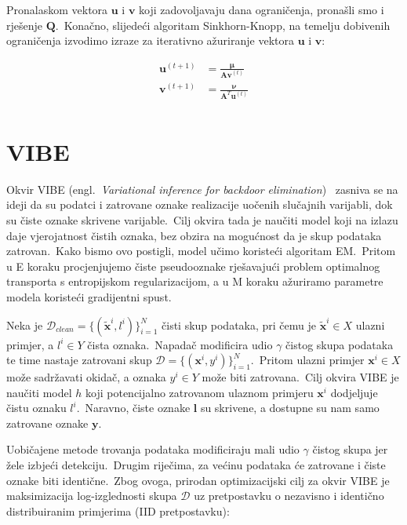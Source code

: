 \documentclass[diplomskirad]{fer}
\begin{document}
Pronalaskom vektora $\bm{u}$ i $\bm{v}$ koji zadovoljavaju dana ograničenja, pronašli smo i rješenje $\bm{Q}$.\ Konačno, slijedeći algoritam Sinkhorn-Knopp, na temelju dobivenih ograničenja izvodimo izraze za iterativno ažuriranje vektora $\bm{u}$ i $\bm{v}$:

\begin{equation}
  \begin{aligned}
    \bm{u}^{(t + 1)} &= \frac{\bm{\mu}}{\bm{A} \bm{v}^{(t)}} \\
    \bm{v}^{(t + 1)} &= \frac{\bm{\nu}}{\bm{A}^T \bm{u}^{(t)}} \\
  \end{aligned}
  \label{eq:sk_final}
\end{equation}

\chapter{VIBE}
\label{pog:vibe}

Okvir VIBE (engl.\ \textit{Variational inference for backdoor elimination})~\cite{sabolic2025seal} zasniva se na ideji da su podatci i zatrovane oznake realizacije uočenih slučajnih varijabli, dok su čiste oznake skrivene varijable.\ 
Cilj okvira tada je naučiti model koji na izlazu daje vjerojatnost čistih oznaka, bez obzira na mogućnost da je skup podataka zatrovan.\ Kako bismo ovo postigli, model učimo koristeći algoritam EM.\ 
Pritom u E koraku procjenjujemo čiste pseudooznake rješavajući problem optimalnog transporta s entropijskom regularizacijom, a u M koraku ažuriramo parametre modela koristeći gradijentni spust.\ 

Neka je $\mathcal{D}_{clean} = \{(\bm{\tilde{x}}^i, l^i)\}_{i=1}^{N}$ čisti skup podataka, pri čemu je $\bm{\tilde{x}}^i \in X$ ulazni primjer, a $l^i \in Y$ čista oznaka.\ 
Napadač modificira udio $\gamma$ čistog skupa podataka te time nastaje zatrovani skup $\mathcal{D} = \{(\bm{x}^i, y^i)\}_{i=1}^{N}$.\ Pritom ulazni primjer $\bm{x}^i \in X$ može sadržavati okidač, a oznaka $y^i \in Y$ može biti zatrovana.\ 
Cilj okvira VIBE je naučiti model $h$ koji potencijalno zatrovanom ulaznom primjeru $\bm{x}^i$ dodjeljuje čistu oznaku $l^i$.\ 
Naravno, čiste oznake $\bm{l}$ su skrivene, a dostupne su nam samo zatrovane oznake $\bm{y}$.\ 

Uobičajene metode trovanja podataka modificiraju mali udio $\gamma$ čistog skupa jer žele izbjeći detekciju.\ Drugim riječima, za većinu podataka će zatrovane i čiste oznake biti identične.\
Zbog ovoga, prirodan optimizacijski cilj za okvir VIBE je maksimizacija log-izglednosti skupa $\mathcal{D}$ uz pretpostavku o nezavisno i identično distribuiranim primjerima (IID pretpostavku):
\end{document}

